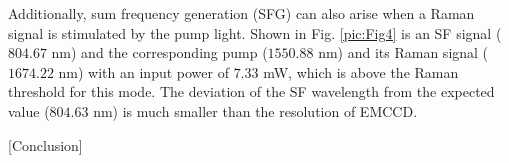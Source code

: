 \documentclass[a4paper,8pt,hyperref, twocolumn]{article}
\begin{document}

Additionally, sum frequency generation (SFG) can also arise when a Raman signal is stimulated by the pump light. 
Shown in Fig. \ref{pic:Fig4} is an SF signal ($804.67$ nm) and the corresponding pump ($1550.88$ nm) and its Raman signal ($1674.22$ nm) with an input power of $7.33$ mW, which is above the Raman threshold for this mode. 
The deviation of the SF wavelength from the expected value ($804.63$ nm) is much smaller than the resolution of EMCCD.

[Conclusion]





\end{document}
